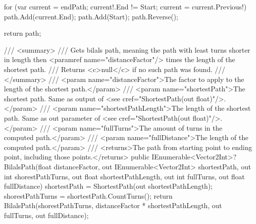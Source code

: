 \documentclass{article}
\begin{document}
\begin{lstcs}[]
{{        for (var current = endPath; current!.End != Start; current = current.Previous!) path.Add(current.End);
        path.Add(Start);
        path.Reverse();

        return path;
    }

    /// <summary>
    /// Gets bilals path, meaning the path with least turns shorter in length then <paramref name="distanceFactor"/> times the length of the shortest path.
    /// Returns <c>null</c> if no such path was found.
    /// </summary>
    /// <param name="distanceFactor">The factor to apply to the length of the shortest path.</param>
    /// <param name="shortestPath">The shortest path. Same as output of <see cref="ShortestPath(out float)"/>.</param>
    /// <param name="shortestPathLength">The length of the shortest path. Same as out parameter of <see cref="ShortestPath(out float)"/>.</param>
    /// <param name="fullTurns">The amount of turns in the computed path.</param>
    /// <param name="fullDistance">The length of the computed path.</param>
    /// <returns>The path from starting point to ending point, including those points.</returns>
    public IEnumerable<Vector2Int>? BilalsPath(float distanceFactor, out IEnumerable<Vector2Int> shortestPath, out int shorestPathTurns, out float shortestPathLength, out int fullTurns, out float fullDistance)
    {
        shortestPath = ShortestPath(out shortestPathLength);
        shorestPathTurns = shortestPath.CountTurns();
        return BilalsPath(shorestPathTurns, distanceFactor * shortestPathLength, out fullTurns, out fullDistance);
    }
}
\end{lstcs}
\end{document}
